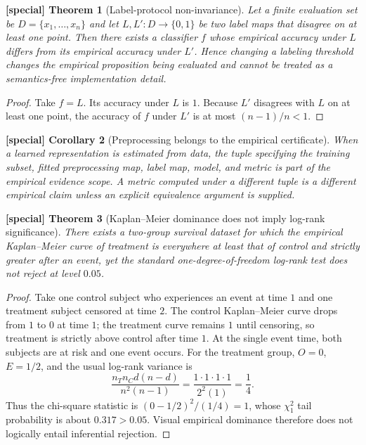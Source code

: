 \documentclass[11pt]{article}
\theoremstyle{special}
\newtheorem{specialthm}{[special] Theorem}[section]
\newtheorem{specialcor}[specialthm]{[special] Corollary}
\theoremstyle{definition}
\begin{document}
\begin{specialthm}[Label-protocol non-invariance]
Let a finite evaluation set be $D=\{x_1,\dots,x_n\}$ and let $L,L':D\to\{0,1\}$ be two label maps that disagree on at least one point. Then there exists a classifier $f$ whose empirical accuracy under $L$ differs from its empirical accuracy under $L'$. Hence changing a labeling threshold changes the empirical proposition being evaluated and cannot be treated as a semantics-free implementation detail.
\end{specialthm}
\begin{proof}
Take $f=L$. Its accuracy under $L$ is $1$. Because $L'$ disagrees with $L$ on at least one point, the accuracy of $f$ under $L'$ is at most $(n-1)/n<1$.\qedhere
\end{proof}

\begin{specialcor}[Preprocessing belongs to the empirical certificate]
When a learned representation is estimated from data, the tuple specifying the training subset, fitted preprocessing map, label map, model, and metric is part of the empirical evidence scope. A metric computed under a different tuple is a different empirical claim unless an explicit equivalence argument is supplied.
\end{specialcor}

\begin{specialthm}[Kaplan--Meier dominance does not imply log-rank significance]
There exists a two-group survival dataset for which the empirical Kaplan--Meier curve of treatment is everywhere at least that of control and strictly greater after an event, yet the standard one-degree-of-freedom log-rank test does not reject at level $0.05$.
\end{specialthm}
\begin{proof}
Take one control subject who experiences an event at time $1$ and one treatment subject censored at time $2$. The control Kaplan--Meier curve drops from $1$ to $0$ at time $1$; the treatment curve remains $1$ until censoring, so treatment is strictly above control after time $1$. At the single event time, both subjects are at risk and one event occurs. For the treatment group, $O=0$, $E=1/2$, and the usual log-rank variance is
\[
\frac{n_Tn_Cd(n-d)}{n^2(n-1)}=\frac{1\cdot1\cdot1\cdot1}{2^2(1)}=\frac14.
\]
Thus the chi-square statistic is $(0-1/2)^2/(1/4)=1$, whose $\chi^2_1$ tail probability is about $0.317>0.05$. Visual empirical dominance therefore does not logically entail inferential rejection.\qedhere
\end{proof}
\end{document}
